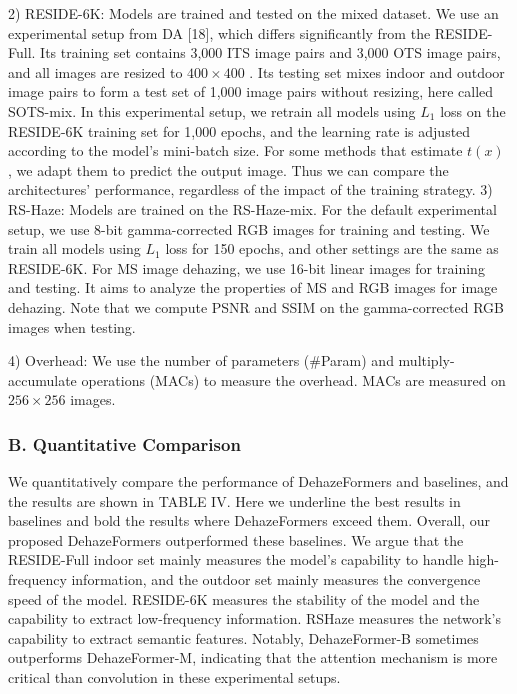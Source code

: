 2) RESIDE-6K: Models are trained and tested on the mixed dataset. We use an experimental setup from DA [18], which differs significantly from the RESIDE-Full. Its training set contains 3,000 ITS image pairs and 3,000 OTS image pairs, and all images are resized to $400\times400$ . Its testing set mixes indoor and outdoor image pairs to form a test set of 1,000 image pairs without resizing, here called SOTS-mix. In this experimental setup, we retrain all models using $L_{1}$ loss on the RESIDE-6K training set for 1,000 epochs, and the learning rate is adjusted according to the model’s mini-batch size. For some methods that estimate $t(x)$ , we adapt them to predict the output image. Thus we can compare the architectures’ performance, regardless of the impact of the training strategy. 3) RS-Haze: Models are trained on the RS-Haze-mix. For the default experimental setup, we use 8-bit gamma-corrected RGB images for training and testing. We train all models using $L_{1}$ loss for 150 epochs, and other settings are the same as RESIDE-6K. For MS image dehazing, we use 16-bit linear images for training and testing. It aims to analyze the properties of MS and RGB images for image dehazing. Note that we compute PSNR and SSIM on the gamma-corrected RGB images when testing.

4) Overhead: We use the number of parameters (\#Param) and multiply-accumulate operations (MACs) to measure the overhead. MACs are measured on $256\times256$ images.

\subsubsection{B. Quantitative Comparison}

We quantitatively compare the performance of DehazeFormers and baselines, and the results are shown in TABLE IV. Here we underline the best results in baselines and bold the results where DehazeFormers exceed them. Overall, our proposed DehazeFormers outperformed these baselines. We argue that the RESIDE-Full indoor set mainly measures the model’s capability to handle high-frequency information, and the outdoor set mainly measures the convergence speed of the model. RESIDE-6K measures the stability of the model and the capability to extract low-frequency information. RSHaze measures the network’s capability to extract semantic features. Notably, DehazeFormer-B sometimes outperforms DehazeFormer-M, indicating that the attention mechanism is more critical than convolution in these experimental setups.

